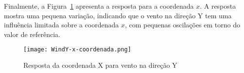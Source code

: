 Finalmente, a Figura~\ref{fig:WindY-x} apresenta a resposta para a coordenada \(x\). A resposta mostra uma pequena variação, indicando que o vento na direção Y tem uma influência limitada sobre a coordenada \(x\), com pequenas oscilações em torno do valor de referência.

\begin{figure}[H]
    \centering
    \texttt{[image: WindY-x-coordenada.png]}
    \caption{Resposta da coordenada X para vento na direção Y}
    \label{fig:WindY-x}
\end{figure}





\printindex
